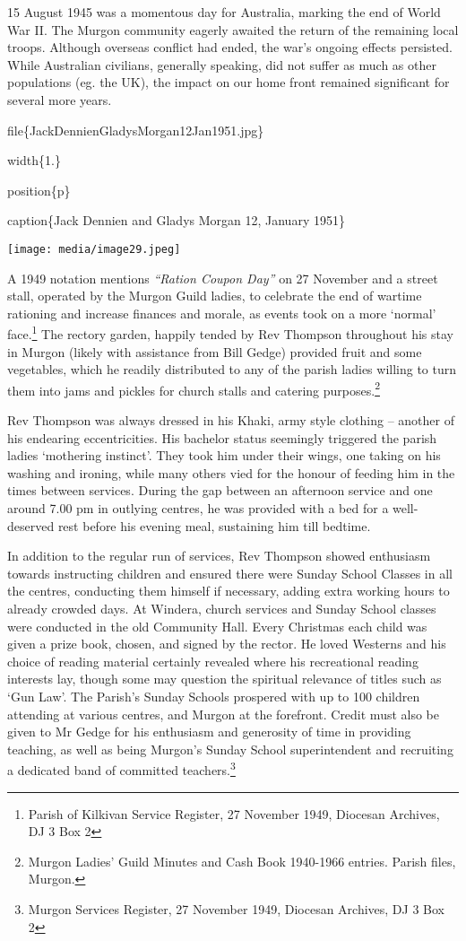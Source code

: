 15 August 1945 was a momentous day for Australia, marking the end of World War II. The Murgon community eagerly awaited the return of the remaining local troops. Although overseas conflict had ended, the war's ongoing effects persisted. While Australian civilians, generally speaking, did not suffer as much as other populations (eg. the UK), the impact on our home front remained significant for several more years.

file\{JackDennienGladysMorgan12Jan1951.jpg\}

width\{1.\}

position\{p\}

caption\{Jack Dennien and Gladys Morgan 12, January 1951\}

\texttt{[image: media/image29.jpeg]}

A 1949 notation mentions \emph{``Ration Coupon Day''} on 27 November and a street stall, operated by the Murgon Guild ladies, to celebrate the end of wartime rationing and increase finances and morale, as events took on a more `normal' face.\footnote{Parish of Kilkivan Service Register, 27 November 1949, Diocesan Archives, DJ 3 Box 2} The rectory garden, happily tended by Rev Thompson throughout his stay in Murgon (likely with assistance from Bill Gedge) provided fruit and some vegetables, which he readily distributed to any of the parish ladies willing to turn them into jams and pickles for church stalls and catering purposes.\footnote{Murgon Ladies' Guild Minutes and Cash Book 1940-1966 entries. Parish files, Murgon.}

Rev Thompson was always dressed in his Khaki, army style clothing -- another of his endearing eccentricities. His bachelor status seemingly triggered the parish ladies `mothering instinct'. They took him under their wings, one taking on his washing and ironing, while many others vied for the honour of feeding him in the times between services. During the gap between an afternoon service and one around 7.00 pm in outlying centres, he was provided with a bed for a well-deserved rest before his evening meal, sustaining him till bedtime.

In addition to the regular run of services, Rev Thompson showed enthusiasm towards instructing children and ensured there were Sunday School Classes in all the centres, conducting them himself if necessary, adding extra working hours to already crowded days. At Windera, church services and Sunday School classes were conducted in the old Community Hall. Every Christmas each child was given a prize book, chosen, and signed by the rector. He loved Westerns and his choice of reading material certainly revealed where his recreational reading interests lay, though some may question the spiritual relevance of titles such as `Gun Law'. The Parish's Sunday Schools prospered with up to 100 children attending at various centres, and Murgon at the forefront. Credit must also be given to Mr Gedge for his enthusiasm and generosity of time in providing teaching, as well as being Murgon's Sunday School superintendent and recruiting a dedicated band of committed teachers.\footnote{Murgon Services Register, 27 November 1949, Diocesan Archives, DJ 3 Box 2}

